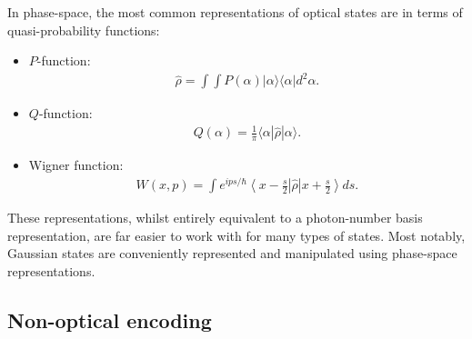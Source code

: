 \documentclass[aps,rmp,twocolumn,amsmath,amssymb,nofootinbib,superscriptaddress,longbibliography,floatfix,table-of-contents,eqsecnum]{revtex4-1}
\newcommand{\bra}[1]{\langle#1|}
\newcommand{\ket}[1]{|#1\rangle}
\begin{document}
In phase-space, the most common representations of optical states are in terms of quasi-probability functions:
\begin{itemize}
\item $P$-function:
\begin{align}
\hat\rho = \int\!\!\!\int P(\alpha) \ket{\alpha}\bra{\alpha} d^2\alpha.
\end{align}
\item $Q$-function:
\begin{align}
Q(\alpha) = \frac{1}{\pi} \bra{\alpha}\hat\rho\ket{\alpha}.
\end{align}
\item Wigner function:
\begin{align}
W(x,p) = \int e^{ips/\hbar} \left\langle{x-\frac{s}{2}}\right| \hat\rho \left|{x+\frac{s}{2}}\right\rangle ds.
\end{align}
\end{itemize}
These representations, whilst entirely equivalent to a photon-number basis representation, are far easier to work with for many types of states. Most notably, Gaussian states are conveniently represented and manipulated using phase-space representations.

%
%

\subsection{Non-optical encoding}
\end{document}
